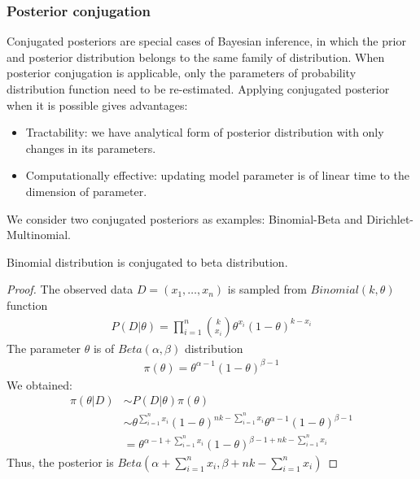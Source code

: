 \subsubsection{Posterior conjugation}
Conjugated posteriors are special cases of Bayesian inference, in which the prior and posterior
distribution belongs to the same family of distribution. When posterior conjugation is applicable,
only the parameters of probability distribution function need to be re-estimated. Applying
conjugated posterior when it is possible gives advantages:
\begin{itemize}
      \item Tractability: we have analytical form of posterior distribution with only changes in its
            parameters.
      \item Computationally effective: updating model parameter is of linear time to the dimension of
            parameter.
\end{itemize}
We consider two conjugated posteriors as examples: Binomial-Beta and Dirichlet-Multinomial.
\begin{lemma}
      Binomial distribution is conjugated to beta distribution.
\end{lemma}
\begin{proof}
      The observed data $D=(x_1,\ldots,x_n)$ is sampled from $Binomial(k, \theta)$ function
      \begin{align*}
            P(D|\theta) = \prod_{i=1}^n{k\choose x_i}\theta^{x_i}(1-\theta)^{k-x_i}
      \end{align*}
      The parameter $\theta$ is of $Beta(\alpha, \beta)$ distribution
      \begin{align*}
            \pi(\theta) = \theta^{\alpha-1}(1-\theta)^{\beta -1}
      \end{align*}
      We obtained:
      \begin{align*}
            \pi(\theta|D) & \sim P(D|\theta)\pi(\theta)                                                                             \\
                          & \sim \theta^{\sum_{i=1}^n x_i}(1-\theta)^{nk -\sum_{i=1}^n x_i} \theta^{\alpha -1} (1-\theta)^{\beta-1} \\
                          & = \theta^{\alpha - 1 + \sum_{i=1}^n x_i}(1-\theta)^{\beta - 1 + nk -\sum_{i=1}^n x_i}
      \end{align*}
      Thus, the posterior is $Beta(\alpha + \sum_{i=1}^n x_i, \beta + nk -\sum_{i=1}^n x_i)$
\end{proof}
